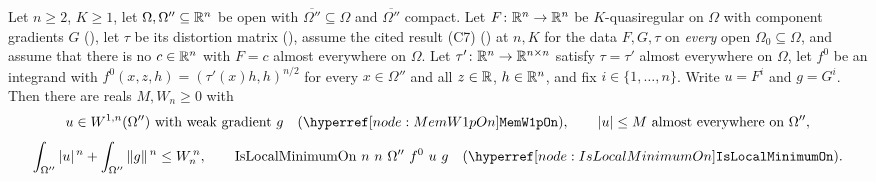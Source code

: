 \begin{lemma}
Let $n\ge2$, $K\ge1$, let $\Omega,\Omega''\subseteq\mathbb{R}^n$ be open with
$\overline{\Omega''}\subseteq\Omega$ and $\overline{\Omega''}$ compact.  Let
$F\colon\mathbb{R}^n\to\mathbb{R}^n$ be $K$-quasiregular on $\Omega$ with component gradients
$G$ (), let $\tau$ be its distortion matrix
(), assume the cited result (C7)
() at $n,K$ for the data $F,G,\tau$ on
\emph{every} open $\Omega_0\subseteq\Omega$, and assume that there is no
$c\in\mathbb{R}^n$ with $F=c$ almost everywhere on $\Omega$.  Let
$\tau'\colon\mathbb{R}^n\to\mathbb{R}^{n\times n}$ satisfy $\tau=\tau'$ almost everywhere on
$\Omega$, let $f^0$ be an integrand with
$f^0(x,z,h)=(\tau'(x)h,h)^{n/2}$ for every $x\in\Omega''$ and all $z\in\mathbb{R}$,
$h\in\mathbb{R}^n$, and fix $i\in\{1,\dots,n\}$.  Write $u=F^i$ and $g=G^i$.  Then
there are reals $M,W_n\ge0$ with
\[
u\in W^{1,n}(\Omega'')\ \text{with weak gradient}\ g
\quad(\noderef{MemW1pOn}),\qquad
|u|\le M\ \text{almost everywhere on }\Omega'',
\]
\[
\int_{\Omega''}|u|^{\,n}+\int_{\Omega''}\|g\|^{\,n}\le W_n^{\,n},
\qquad
\mathrm{IsLocalMinimumOn}\ n\ n\ \Omega''\ f^0\ u\ g
\quad(\noderef{IsLocalMinimumOn}).
\]
\end{lemma}
